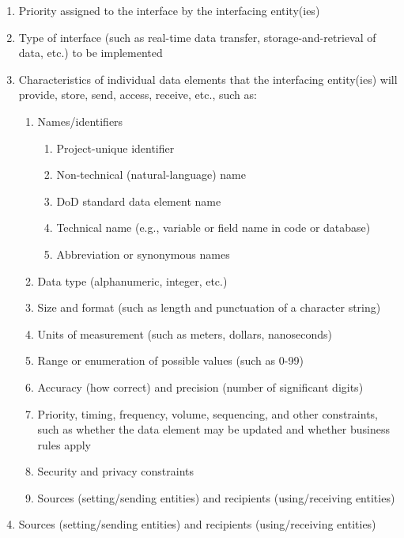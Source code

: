 \begin{enumerate}
\itemsep1pt\parskip0pt
\item
  Priority assigned to the interface by the interfacing entity(ies)
\item
  Type of interface (such as real-time data transfer,
  storage-and-retrieval of data, etc.) to be implemented
\item
  Characteristics of individual data elements that the interfacing
  entity(ies) will provide, store, send, access, receive, etc., such as:

  \begin{enumerate}
  \itemsep1pt\parskip0pt
  \item
    Names/identifiers

    \begin{enumerate}
    \itemsep1pt\parskip0pt
    \item
      Project-unique identifier
    \item
      Non-technical (natural-language) name
    \item
      DoD standard data element name
    \item
      Technical name (e.g., variable or field name in code or database)
    \item
      Abbreviation or synonymous names
    \end{enumerate}
  \item
    Data type (alphanumeric, integer, etc.)
  \item
    Size and format (such as length and punctuation of a character
    string)
  \item
    Units of measurement (such as meters, dollars, nanoseconds)
  \item
    Range or enumeration of possible values (such as 0-99)
  \item
    Accuracy (how correct) and precision (number of significant digits)
  \item
    Priority, timing, frequency, volume, sequencing, and other
    constraints, such as whether the data element may be updated and
    whether business rules apply
  \item
    Security and privacy constraints
  \item
    Sources (setting/sending entities) and recipients (using/receiving
    entities)
  \end{enumerate}
\item
  Sources (setting/sending entities) and recipients (using/receiving
  entities)


\end{enumerate}

